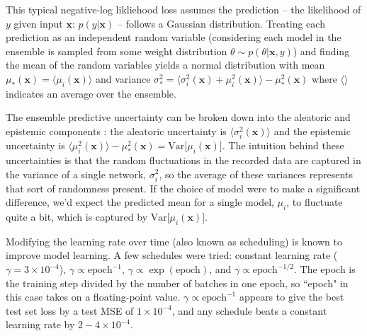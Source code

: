 This typical negative-log likliehood loss assumes the prediction -- the likelihood of $y$ given input $\mathbf{x}$: $p(y|\mathbf{x})$ -- follows a Gaussian distribution. Treating each prediction as an independent random variable (considering each model in the ensemble is sampled from some weight distribution $\theta \sim p(\theta | \mathbf{x}, y)$) and finding the mean of the random variables yields a normal distribution with mean $\mu_* (\mathbf{x}) = \langle \mu_i(\mathbf{x}) \rangle $ and variance $\sigma^2_* = \langle \sigma^2_i(\mathbf{x}) + \mu^2_i(\mathbf{x}) \rangle - \mu^2_* (\mathbf{x})$ where $\langle \rangle$ indicates an average over the ensemble.

The ensemble predictive uncertainty can be broken down into the aleatoric and epistemic components \cite{valdenegro-toro_deeper_2022}: the aleatoric uncertainty is $\langle \sigma^2_i (\mathbf{x}) \rangle$ and the epistemic uncertainty is $\langle \mu^2_i (\mathbf{x}) \rangle - \mu^2_* (\mathbf{x}) = \text{Var}\lbrack\mu_i (\mathbf{x}) \rbrack$. The intuition behind these uncertainties is that the random fluctuations in the recorded data are captured in the variance of a single network, $\sigma^2_i$, so the average of these variances represents that sort of randomness present. If the choice of model were to make a significant difference, we'd expect the predicted mean for a single model, $\mu_i$, to fluctuate quite a bit, which is captured by $\text{Var}\lbrack\mu_i (\mathbf{x}) \rbrack$. 


Modifying the learning rate over time (also known as scheduling) is known to improve model learning. A few schedules were tried: constant learning rate ($\gamma = 3 \times 10^{-4}$), $\gamma \propto \text{epoch}^{-1}$, $\gamma \propto \exp{(\text{epoch})}$, and $\gamma \propto \text{epoch}^{-1/2}$. The epoch is the training step divided by the number of batches in one epoch, so ``epoch" in this case takes on a floating-point value. $\gamma \propto \text{epoch}^{-1}$ appears to give the best test set loss by a test MSE of $1 \times 10^{-4}$, and any schedule beats a constant learning rate by $2-4 \times 10^{-4}$. 


